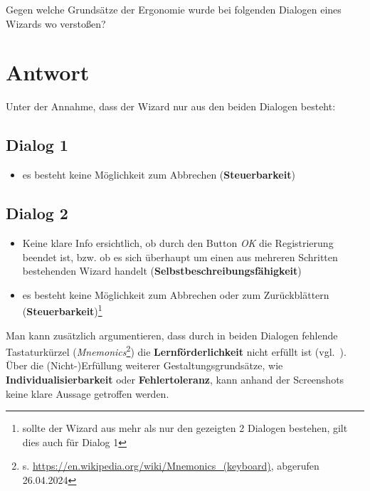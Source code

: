 Gegen welche Grundsätze der Ergonomie wurde bei folgenden Dialogen eines Wizards wo verstoßen?\\

\section*{Antwort}

Unter der Annahme, dass der Wizard nur aus den beiden Dialogen besteht:

\subsection*{Dialog 1}
\begin{itemize}
    \item es besteht keine Möglichkeit zum Abbrechen (\textbf{Steuerbarkeit})
\end{itemize}


\subsection*{Dialog 2}
\begin{itemize}
    \item Keine klare Info ersichtlich, ob durch den Button \textit{OK} die Registrierung beendet ist, bzw. ob es sich überhaupt um einen aus mehreren Schritten bestehenden Wizard handelt (\textbf{Selbstbeschreibungsfähigkeit})
    \item es besteht keine Möglichkeit zum Abbrechen oder zum Zurückblättern (\textbf{Steuerbarkeit})\footnote{
    sollte der Wizard aus mehr als nur den gezeigten 2 Dialogen bestehen, gilt dies auch für Dialog 1
    }
\end{itemize}

\noindent
Man kann zusätzlich argumentieren, dass durch in beiden Dialogen fehlende Tastaturkürzel (\textit{Mnemonics}\footnote{
    s. \url{https://en.wikipedia.org/wiki/Mnemonics_(keyboard)}, abgerufen 26.04.2024
}) die \textbf{Lernförderlichkeit} nicht erfüllt ist (vgl.~\cite[147]{Rau07f}).\\

\noindent
Über die (Nicht-)Erfüllung weiterer Gestaltungsgrundsätze, wie \textbf{Individualisierbarkeit} oder \textbf{Fehlertoleranz}, kann anhand der Screenshots keine klare Aussage getroffen werden.